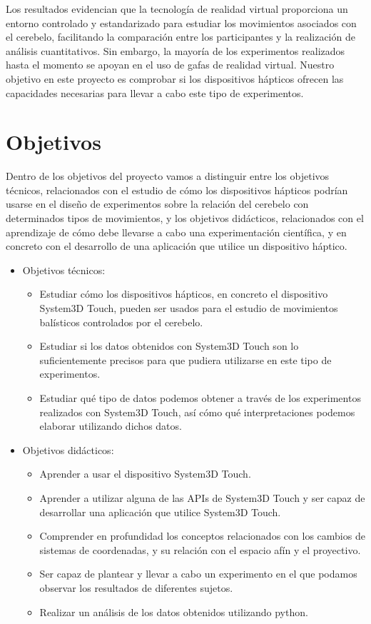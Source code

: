 \documentclass[a4paper,11pt, oneside]{book}
\begin{document}
Los resultados evidencian que la tecnología de realidad virtual proporciona un entorno controlado y estandarizado para estudiar los movimientos asociados con el cerebelo, facilitando la comparación entre los participantes y la realización de análisis cuantitativos. Sin embargo, la mayoría de los experimentos realizados hasta el momento se apoyan en el uso de gafas de realidad virtual. Nuestro objetivo en este proyecto es comprobar si los dispositivos hápticos ofrecen las capacidades necesarias para llevar a cabo este tipo de experimentos.

\section{Objetivos}

Dentro de los objetivos del proyecto vamos a distinguir entre los objetivos técnicos, relacionados con el estudio de cómo los dispositivos hápticos podrían usarse en el diseño de experimentos sobre la relación del cerebelo con determinados tipos de movimientos, y los objetivos didácticos, relacionados con el aprendizaje de cómo debe llevarse a cabo una experimentación científica, y en concreto con el desarrollo de una aplicación que utilice un dispositivo háptico.

\begin{itemize}
	\item Objetivos técnicos:
	\begin{itemize}
	\item Estudiar cómo los dispositivos hápticos, en concreto el dispositivo System3D Touch, pueden ser usados para el estudio de movimientos balísticos controlados por el cerebelo.
	
	\item Estudiar si los datos obtenidos con System3D Touch son lo suficientemente precisos para que pudiera utilizarse en este tipo de experimentos.
	
	\item Estudiar qué tipo de datos podemos obtener a través de los experimentos realizados con System3D Touch, así cómo qué interpretaciones podemos elaborar utilizando dichos datos.

	\end{itemize}
	\item Objetivos didácticos:
	\begin{itemize}
		\item Aprender a usar el dispositivo System3D Touch.
		\item Aprender a utilizar alguna de las APIs de System3D Touch y ser capaz de desarrollar una aplicación que utilice System3D Touch.
		\item Comprender en profundidad los conceptos relacionados con los cambios de sistemas de coordenadas, y su relación con el espacio afín y el proyectivo. 
		\item Ser capaz de plantear y llevar a cabo un experimento en el que podamos observar los resultados de diferentes sujetos.
		\item Realizar un análisis de los datos obtenidos utilizando python.

	\end{itemize}
\end{itemize}
\end{document}
